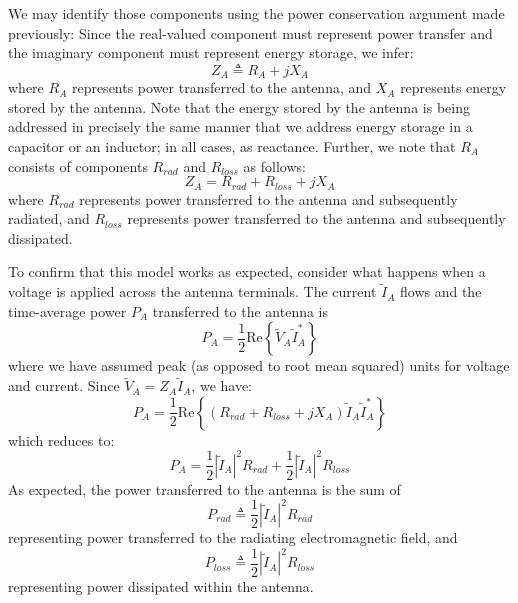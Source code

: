 We may identify those components using the power conservation argument made previously: 
Since the real-valued component must represent power transfer and the imaginary component must represent energy storage, we infer:
%
\begin{equation}
Z_A \triangleq R_A +jX_A
\end{equation}
%
where $R_A$ represents power transferred to the antenna, and $X_A$ represents energy stored by the antenna.  
Note that the energy stored by the antenna is being addressed in precisely the same manner that we address energy storage in a capacitor or an inductor; in all cases, as reactance.
Further, we note that $R_A$ consists of components $R_{rad}$ and $R_{loss}$ as follows:
%
\begin{equation}
Z_A = R_{rad} + R_{loss} +jX_A
\end{equation}
%
where $R_{rad}$ represents power transferred to the antenna and subsequently radiated, and $R_{loss}$ represents power transferred to the antenna and subsequently dissipated. 

To confirm that this model works as expected, consider what happens when a voltage is applied across the antenna terminals.
The current $\widetilde{I}_A$ flows and the time-average power $P_A$ transferred to the antenna is 
%
\begin{equation}
P_A = \frac{1}{2}\mbox{Re}\left\{ \widetilde{V}_A \widetilde{I}^*_A \right\}
\end{equation}
%
where we have assumed peak (as opposed to root mean squared) units for voltage and current.
Since $\widetilde{V}_A = Z_A \widetilde{I}_A$, we have:
%
\begin{equation}
P_A = \frac{1}{2}\mbox{Re}\left\{ \left( R_{rad} + R_{loss} +jX_A \right) \widetilde{I}_A  \widetilde{I}^*_A \right\}
\end{equation}
%
which reduces to:
%
\begin{equation}
P_A = \frac{1}{2}\left|\widetilde{I}_A\right|^2 R_{rad} + \frac{1}{2}\left|\widetilde{I}_A\right|^2 R_{loss}
\label{m0202_ePA}
\end{equation}
%
As expected, the power transferred to the antenna is the sum of 
%
\begin{equation}
P_{rad} \triangleq \frac{1}{2}\left|\widetilde{I}_A\right|^2 R_{rad} 
\label{m0202_ePrad}
\end{equation}
%
representing power transferred to the radiating electromagnetic field, and
%
\begin{equation}
P_{loss} \triangleq \frac{1}{2}\left|\widetilde{I}_A\right|^2 R_{loss} 
\label{m0202_ePloss}
\end{equation}
%
representing power dissipated within the antenna.

